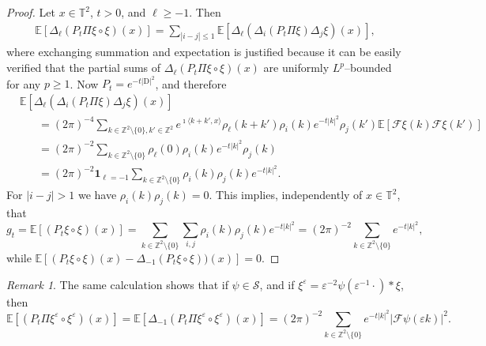 \documentclass[a4paper,11pt]{article}
\newcommand{\mathD}{\mathrm{D}}
\theoremstyle{remark}
\newtheorem{remark}[theorem]{Remark}
\newcommand{\Z}{\mathbb{Z}}
\newcommand{\E}{\mathbb{E}}
\newcommand{\CF}{\ensuremath{\mathscr{F}}}
\newcommand{\CS}{\ensuremath{\mathscr{S}}}
\newcommand{\reso}{\,\mathord{\circ}\,}
\begin{document}
\begin{proof}
   Let $x \in \mathbb{T}^2$, $t > 0$, and $\ell \geqslant - 1$. Then
   \begin{align*}
      \E[\Delta_\ell ( P_t \Pi \xi \reso \xi) ( x ) ] = \sum_{| i - j |\leqslant 1} \E [ \Delta_\ell ( \Delta_i ( P_t \Pi \xi) \Delta_j \xi ) ( x ) ], 
   \end{align*}
   where exchanging summation and expectation is justified because it can be easily verified that the partial sums of $\Delta_\ell ( P_t \Pi \xi \reso \xi ) ( x )$ are uniformly $L^p$--bounded for any $p \geqslant 1$. %
   Now $P_t = e^{-t\lvert \mathD \rvert^2}$, and therefore
   \begin{align*}
      &\E[\Delta_\ell ( \Delta_i ( P_t \Pi \xi )\Delta_j \xi ) ( x ) ] \\
      &\hspace{20pt} = ( 2 \pi )^{-4} \sum_{k \in \mathbb{Z}^2 \setminus \{0\}, k' \in \Z^2} e^{\imath \langle k+k', x \rangle}\rho_\ell ( k + k' ) \rho_i ( k ) e^{- t | k|^2} \rho_j (k') \E [\CF{\xi} ( k ) \CF{\xi}(k')]\\
      &\hspace{20pt} = (2\pi)^{-2} \sum_{k \in \mathbb{Z}^2\setminus \{0\}} \rho_\ell ( 0 ) \rho_i ( k) e^{- t | k |^2} \rho_j ( k ) \\
      &\hspace{20pt} =  (2\pi)^{-2}\mathbf{1}_{\ell=-1} \sum_{k \in \mathbb{Z}^2 \setminus \{0\}} \rho_i(k) \rho_j ( k ) e^{- t | k |^2}.
   \end{align*}
   For $| i - j | > 1$ we have $\rho_i(k) \rho_j(k) = 0$. This implies, independently of $x \in \mathbb{T}^2$, that
   \[
      g_t = \E[ ( P_t \xi \reso \xi)(x)] = \sum_{k \in \mathbb{Z}^2\setminus \{0\}} \sum_{i, j} \rho_i ( k) \rho_j ( k ) e^{- t | k |^2} = (2\pi)^{-2} \sum_{k \in \mathbb{Z}^2 \setminus{\{0\}}} e^{- t | k |^2} ,
   \]
   while $\E[(P_t \xi \reso \xi)(x) - \Delta_{- 1} ( P_t \xi \reso \xi))( x ) ] = 0$.
\end{proof}

\begin{remark}
   The same calculation shows that if $\psi \in \CS$, and if $\xi^\varepsilon = \varepsilon^{-2} \psi (\varepsilon^{-1} \cdot) \ast \xi$, then
   \[
      \E[ (P_t \Pi \xi^\varepsilon \reso \xi^\varepsilon) ( x ) ] = \E[ \Delta_{- 1} (P_t \Pi \xi^\varepsilon \reso \xi^\varepsilon ) ( x ) ] = (2\pi)^{-2} \sum_{k \in\mathbb{Z}^2\setminus \{0\}} e^{- t | k |^2} |\CF \psi (\varepsilon k)|^2.
   \]
\end{remark}
\end{document}
